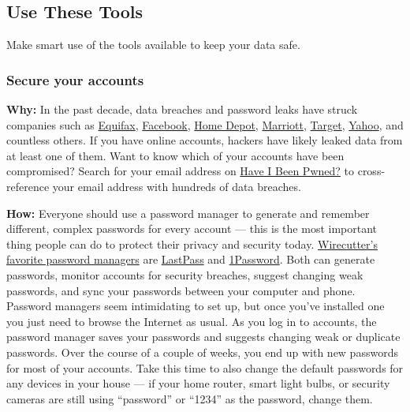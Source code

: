 \hypertarget{use-these-tools}{%
\subsection{Use These Tools}\label{use-these-tools}}

Make smart use of the tools available to keep your data safe.~

\hypertarget{secure-your-accounts}{%
\subsubsection{Secure your accounts}\label{secure-your-accounts}}

\textbf{Why:} In the past decade, data breaches and password leaks have
struck companies such as
\href{https://www.nytimes.com/interactive/2017/your-money/equifax-data-breach-credit.html\#first}{Equifax},
\href{https://www.nytimes.com/2019/03/21/technology/personaltech/facebook-passwords.html}{Facebook},
\href{https://bits.blogs.nytimes.com/2014/09/08/home-depot-confirms-that-it-was-hacked/}{Home
Depot},
\href{https://www.nytimes.com/2018/11/30/business/marriott-data-breach.html}{Marriott},
\href{https://www.nytimes.com/2014/01/18/business/a-sneaky-path-into-target-customers-wallets.html}{Target},
\href{https://www.nytimes.com/2017/10/03/technology/yahoo-hack-3-billion-users.html}{Yahoo},
and countless others. If you have online accounts, hackers have likely
leaked data from at least one of them. Want to know which of your
accounts have been compromised? Search for your email address on
\href{https://haveibeenpwned.com/}{Have I Been Pwned?} to
cross-reference your email address with hundreds of data breaches.~

\textbf{How:} Everyone should use a password manager to generate and
remember different, complex passwords for every account --- this is the
most important thing people can do to protect their privacy and security
today.
\href{https://thewirecutter.com/reviews/best-password-managers/}{Wirecutter's
favorite password managers} are
\href{https://www.lastpass.com/}{LastPass} and
\href{https://1password.com/}{1Password}. Both can generate passwords,
monitor accounts for security breaches, suggest changing weak passwords,
and sync your passwords between your computer and phone. Password
managers seem intimidating to set up, but once you've installed one you
just need to browse the Internet as usual. As you log in to accounts,
the password manager saves your passwords and suggests changing weak or
duplicate passwords. Over the course of a couple of weeks, you end up
with new passwords for most of your accounts. Take this time to also
change the default passwords for any devices in your house --- if your
home router, smart light bulbs, or security cameras are still using
``password'' or ``1234'' as the password, change them.

